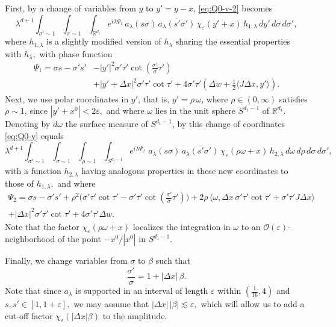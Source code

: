 \documentclass[leqno]{amsart}
\theoremstyle{definition}
\theoremstyle{remark}
\numberwithin{equation}{section}
\newcommand{\R}{\mathbb{R}}
\newcommand\la{{\lambda}}
\newcommand\ve{{\varepsilon}}
\begin{document}
First, by  a change of variables from $y$ to $y'=y- x$, \eqref{eq:Q0-v-2} becomes
\begin{equation}\label{eq:Q0-y}
\lambda^{d + 1} \int_{\sigma' \sim 1} \int_{\sigma \sim 1} \int_{\R^{d_1}} e^{i\lambda\Psi_1} \,a_\lambda(s\sigma)  \,\overline{a_\lambda(s'\sigma')}  \, 
\chi_{\varepsilon}(y'+x) \,h_{1,\lambda} \, dy' \, d\sigma \, d\sigma',
\end{equation}
where  $ h_{1,\lambda}$ is a  slightly modified version of $h_\la$ sharing the essential  properties with $h_\la,$ with  phase function
\begin{align*}
\Psi_1 = \sigma s - \sigma's'& - \left|y'\right|^2\sigma'\tau' \cot(\tfrac{\sigma'}\sigma \tau') \\
& + \left|y' + \Delta x\right|^2\sigma' \tau' \cot \tau' + 4\sigma'\tau'(\Delta w + \tfrac12\langle J\Delta x,y' \rangle).
\end{align*}
Next, we use polar coordinates in $y'$, that is, $y' = \rho \, \omega$, where $\rho \in (0,\infty)$ satisfies $\rho \sim 1$, since 
$|y'+x^0|<2\ve,$ and where $\omega$ lies in the unit sphere $S^{d_1-1}$ of $\R^{d_1}.$  Denoting by $d\omega$ the surface measure of $S^{d_1-1}$,  by this change of coordinates \eqref{eq:Q0-y} equals
\[
\lambda^{d + 1} \int_{\sigma' \sim 1} \int_{\sigma \sim 1}  \int_{\rho \sim 1}  \int_{S^{d_1-1}} e^{i\lambda \Psi_2} \, \,a_\lambda(s\sigma)  \,\overline{a_\lambda(s'\sigma')}  \, \chi_{\varepsilon}(\rho\omega + x) \, h_{2,\lambda}\, d\omega \, d\rho  \, d\sigma \, d\sigma' ,
\]
with a function $ h_{2,\lambda}$  having analogous properties in these new coordinates to those of $h_{1,\la}, $ and 
where
\begin{multline*}
\Psi_2 = \sigma s - \sigma's'  + \rho^2\big(\sigma' \tau' \cot \tau' -\sigma'\tau' \cot(\tfrac{\sigma'}\sigma \tau')\big) 
 + 2\rho \, \big\langle \omega, \Delta x \, \sigma' \tau' \cot \tau' +\sigma'\tau' J\Delta x\big\rangle \\
 + |\Delta x|^2\sigma' \tau' \cot \tau' + 4 \sigma'\tau' \Delta w.
\end{multline*}
Note that the factor $\chi_{\varepsilon}(\rho\omega + x)$ localizes the integration in $\omega$ to an $\mathcal{O} (\ve)$- neighborhood of the point $-x^0/|x^0|$ in $S^{d_1-1}.$

Finally, we change variables from $\sigma$ to $\beta$ such that
\[
\frac{\sigma'}\sigma = 1 + |\Delta x| \, \beta.
\]
Note that since $a_\la$ is supported in an interval of length $\ve$ within $(\frac{1}{16}, 4)$ and $s,s'\in[1,1+\ve],$ we may assume that $|\Delta x| \, |\beta|\lesssim \ve,$ which will allow us to add a cut-off  factor $\chi_\ve(\left|\Delta x\right|\beta)$ to the amplitude.
\end{document}

